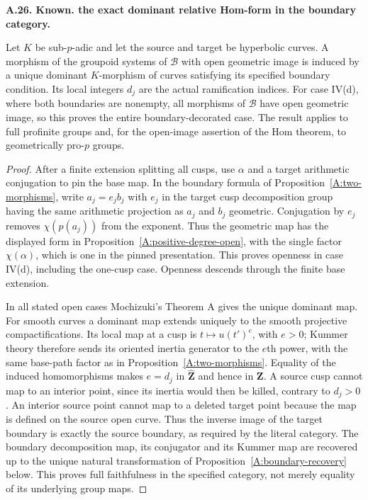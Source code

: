 \documentclass[11pt,oneside]{article}
\makeatletter
\newcounter{statementanchor}
\newenvironment{statement}[3]{%
 \refstepcounter{statementanchor}\def\@currentlabel{#1}%
 \par\addvspace{9pt}\noindent
 \textbf{#1. #2. #3.}\par\nobreak\noindent\ignorespaces
}{\par\addvspace{5pt}}
\makeatother
\begin{document}
\begin{statement}{A.26}{Known}{the exact dominant relative Hom-form in the boundary category}
\label{st:A.26}
\label{A:relative-hom}
Let $K$ be sub-$p$-adic and let the source and target
be hyperbolic curves.  A morphism of the groupoid
systems of $\mathcal B$ with open geometric image is
induced by a unique dominant $K$-morphism of curves
satisfying its specified boundary condition.  Its local
integers $d_j$ are the actual ramification indices.
For case IV(d), where both boundaries are nonempty,
all morphisms of $\mathcal B$ have open geometric
image, so this proves the entire boundary-decorated
case.  The result applies to full profinite groups and,
for the open-image assertion of the Hom theorem, to
geometrically pro-$p$ groups.
\end{statement}
\begin{proof}
After a finite extension splitting all cusps, use
$\alpha$ and a target arithmetic conjugation to pin the
base map.  In the boundary formula of
Proposition~\ref{A:two-morphisms}, write
$a_j=e_jb_j$ with $e_j$ in the target cusp decomposition
group having the same arithmetic projection as $a_j$
and $b_j$ geometric.  Conjugation by $e_j$ removes
$\chi(p(a_j))$ from the exponent.  Thus the geometric
map has the displayed form in
Proposition~\ref{A:positive-degree-open}, with the
single factor $\chi(\alpha)$, which is one in the
pinned presentation.  This proves openness in case
IV(d), including the one-cusp case.  Openness descends
through the finite base extension.

In all stated open cases Mochizuki's Theorem A
\cite{A_Mochizuki1999} gives the unique dominant map.
For smooth curves a dominant map extends uniquely to
the smooth projective compactifications.  Its local
map at a cusp is $t\mapsto u(t')^e$, with $e>0$;
Kummer theory therefore sends its oriented inertia
generator to the $e$th power, with the same base-path
factor as in Proposition~\ref{A:two-morphisms}.
Equality of the induced homomorphisms makes $e=d_j$
in $\widehat{\mathbf Z}$ and hence in $\mathbf Z$.
A source cusp cannot map to an interior point, since
its inertia would then be killed, contrary to $d_j>0$.
An interior source point cannot map to a deleted target
point because the map is defined on the source open
curve.  Thus the inverse image of the target boundary
is exactly the source boundary, as required by the
literal category.  The boundary decomposition map,
its conjugator and its Kummer map are recovered up to
the unique natural transformation of
Proposition~\ref{A:boundary-recovery} below.  This
proves full faithfulness in the specified category,
not merely equality of its underlying group maps.
\end{proof}
\end{document}

